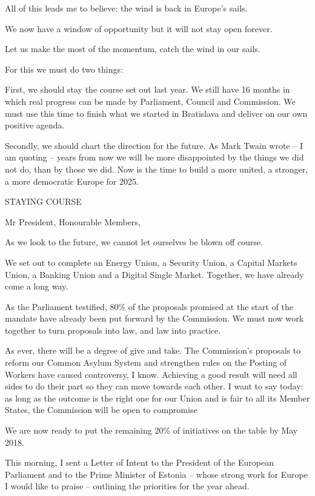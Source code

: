 \documentclass[a4paper,11pt]{article}
\begin{document}
All of this leads me to believe: the wind is back in Europe's sails.

We now have a window of opportunity but it will not stay open forever.

Let us make the most of the momentum, catch the wind in our sails.

For this we must do two things:

First, we should stay the course set out last year. We still have 16 months in which real progress can be made by Parliament, Council and Commission. We must use this time to finish what we started in Bratislava and deliver on our own positive agenda.

Secondly, we should chart the direction for the future. As Mark Twain wrote – I am quoting – years from now we will be more disappointed by the things we did not do, than by those we did. Now is the time to build a more united, a stronger, a more democratic Europe for 2025.

 


 

STAYING COURSE

Mr President, Honourable Members,

As we look to the future, we cannot let ourselves be blown off course.

We set out to complete an Energy Union, a Security Union, a Capital Markets Union, a Banking Union and a Digital Single Market. Together, we have already come a long way.

As the Parliament testified, 80\% of the proposals promised at the start of the mandate have already been put forward by the Commission. We must now work together to turn proposals into law, and law into practice.

As ever, there will be a degree of give and take. The Commission's proposals to reform our Common Asylum System and strengthen rules on the Posting of Workers have caused controversy, I know. Achieving a good result will need all sides to do their part so they can move towards each other. I want to say today: as long as the outcome is the right one for our Union and is fair to all its Member States, the Commission will be open to compromise

We are now ready to put the remaining 20\% of initiatives on the table by May 2018.

This morning, I sent a Letter of Intent to the President of the European Parliament and to the Prime Minister of Estonia – whose strong work for Europe I would like to praise – outlining the priorities for the year ahead.
\end{document}
